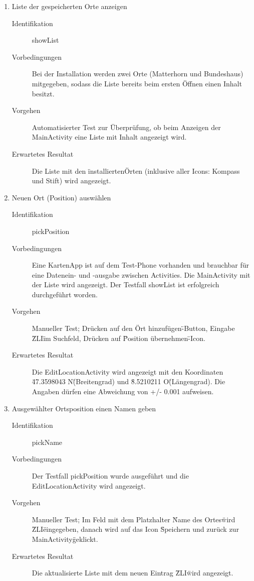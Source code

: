 \documentclass[12pt,a4paper]{scrartcl}
\begin{document}
\begin{enumerate}
  \item Liste der gespeicherten Orte anzeigen

  \begin{description}
    \item [Identifikation] showList
    \item [Vorbedingungen] Bei der Installation werden zwei Orte (Matterhorn und Bundeshaus) mitgegeben, sodass die Liste bereits beim ersten Öffnen einen Inhalt besitzt.
    \item [Vorgehen] Automatisierter Test zur Überprüfung, ob beim Anzeigen der MainActivity eine Liste mit Inhalt angezeigt wird.
    \item [Erwartetes Resultat] Die Liste mit den \"installierten\" Orten (inklusive aller Icons: Kompass und Stift) wird angezeigt.
  \end{description}

  \item Neuen Ort (Position) auswählen

  \begin{description}
    \item [Identifikation] pickPosition
    \item [Vorbedingungen] Eine KartenApp ist auf dem Test-Phone vorhanden und brauchbar für eine Datenein- und -ausgabe zwischen Activities. Die MainActivity mit der Liste wird angezeigt. Der Testfall showList ist erfolgreich durchgeführt worden.
    \item [Vorgehen] Manueller Test; Drücken auf den \"Ort hinzufügen\"-Button, Eingabe \"ZLI\" im Suchfeld, Drücken auf \"Position übernehmen\"-Icon.
    \item [Erwartetes Resultat] Die EditLocationActivity wird angezeigt mit den Koordinaten \"47.3598043 N\" (Breitengrad) und \"8.5210211 O\" (Längengrad). Die Angaben dürfen eine Abweichung von +/- 0.001 aufweisen.
  \end{description}

  \item Ausgewählter Ortsposition einen Namen geben

  \begin{description}
    \item [Identifikation] pickName
    \item [Vorbedingungen] Der Testfall pickPosition wurde ausgeführt und die EditLocationActivity wird angezeigt.
    \item [Vorgehen] Manueller Test; Im Feld mit dem Platzhalter \"Name des Ortes\" wird \"ZLI\" eingegeben, danach wird auf das Icon \"Speichern und zurück zur MainActivity\" geklickt.
    \item [Erwartetes Resultat] Die aktualisierte Liste mit dem neuen Eintrag \"ZLI\" wird angezeigt.
  \end{description}


\end{enumerate}
\end{document}
